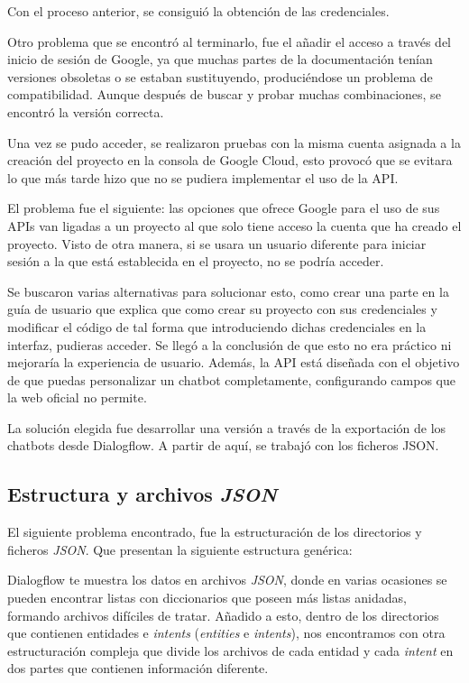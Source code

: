Con el proceso anterior, se consiguió la obtención de las credenciales. 

Otro problema que se encontró al terminarlo, fue el añadir el acceso a través del inicio de sesión de Google, ya que muchas partes de la documentación tenían versiones obsoletas o se estaban sustituyendo, produciéndose un problema de compatibilidad. Aunque después de buscar y probar muchas combinaciones, se encontró la versión correcta.

Una vez se pudo acceder, se realizaron pruebas con la misma cuenta asignada a la creación del proyecto en la consola de Google Cloud, esto provocó que se evitara lo que más tarde hizo que no se pudiera implementar el uso de la API. 

El problema fue el siguiente: las opciones que ofrece Google para el uso de sus APIs van ligadas a un proyecto al que solo tiene acceso la cuenta que ha creado el proyecto. Visto de otra manera, si se usara un usuario diferente para iniciar sesión a la que está establecida en el proyecto, no se podría acceder. 

Se buscaron varias alternativas para solucionar esto, como crear una parte en la guía de usuario que explica que como crear su proyecto con sus credenciales y modificar el código de tal forma que introduciendo dichas credenciales en la interfaz, pudieras acceder. Se llegó a la conclusión de que esto no era práctico ni mejoraría la experiencia de usuario. Además, la API está diseñada con el objetivo de que puedas personalizar un chatbot completamente, configurando campos que la web oficial no permite.

La solución elegida fue desarrollar una versión a través de la exportación de los chatbots desde Dialogflow. A partir de aquí, se trabajó con los ficheros JSON.

\subsection{Estructura y archivos \textit{JSON}}
El siguiente problema encontrado, fue la estructuración de los directorios y ficheros \textit{JSON}. Que presentan la siguiente estructura genérica:

Dialogflow te muestra los datos en archivos \textit{JSON}, donde en varias ocasiones se pueden encontrar listas con diccionarios que poseen más listas anidadas, formando archivos difíciles de tratar. Añadido a esto, dentro de los directorios que contienen entidades e \textit{intents} (\textit{entities} e \textit{intents}), nos encontramos con otra estructuración compleja que divide los archivos de cada entidad y cada \textit{intent} en dos partes que contienen información diferente.


